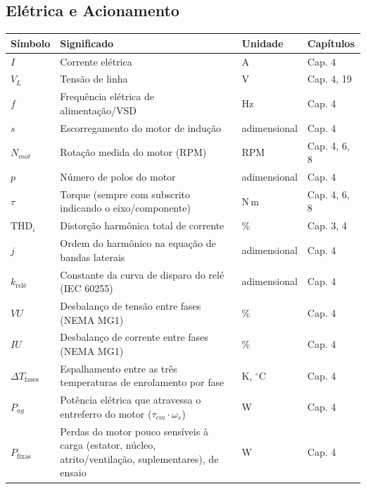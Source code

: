 \documentclass[12pt,a4paper]{article}
\numberwithin{equation}{section}
\numberwithin{table}{section}
\numberwithin{figure}{section}
\begin{document}
{{\subsection*{Elétrica e Acionamento}
\begin{longtable}{>{\raggedright\arraybackslash}p{2.8cm} >{\raggedright\arraybackslash}p{5.3cm} >{\raggedright\arraybackslash}p{2.1cm} >{\raggedright\arraybackslash}p{4.2cm}}
	\toprule
	\textbf{Símbolo} & \textbf{Significado} & \textbf{Unidade} & \textbf{Capítulos} \\ \midrule
	\endhead
	$I$ & Corrente elétrica & A & Cap. 4 \\
	$V_L$ & Tensão de linha & V & Cap. 4, 19 \\
	$f$ & Frequência elétrica de alimentação/VSD & Hz & Cap. 4 \\
	$s$ & Escorregamento do motor de indução & adimensional & Cap. 4 \\
	$N_{mot}$\dag & Rotação medida do motor (RPM) & RPM & Cap. 4, 6, 8 \\
	$p$ & Número de polos do motor & adimensional & Cap. 4 \\
	$\tau$ & Torque (sempre com subscrito indicando o eixo/componente) & N\,m & Cap. 4, 6, 8 \\
	$\text{THD}_i$ & Distorção harmônica total de corrente & \% & Cap. 3, 4 \\
	$j$\dag & Ordem do harmônico na equação de bandas laterais & adimensional & Cap. 4 \\
	$k_{\text{relé}}$\dag & Constante da curva de disparo do relé (IEC 60255) & adimensional & Cap. 4 \\
	$VU$ & Desbalanço de tensão entre fases (NEMA MG1) & \% & Cap. 4 \\
	$IU$ & Desbalanço de corrente entre fases (NEMA MG1) & \% & Cap. 4 \\
	$\Delta T_{\text{fases}}$ & Espalhamento entre as três temperaturas de enrolamento por fase & K, $^{\circ}$C & Cap. 4 \\
	$P_{ag}$ & Potência elétrica que atravessa o entreferro do motor ($\tau_{em}\cdot\omega_s$) & W & Cap. 4 \\
	$P_{\text{fixas}}$ & Perdas do motor pouco sensíveis à carga (estator, núcleo, atrito/ventilação, suplementares), de ensaio & W & Cap. 4 \\ \bottomrule
\end{longtable}

}}
\end{document}
